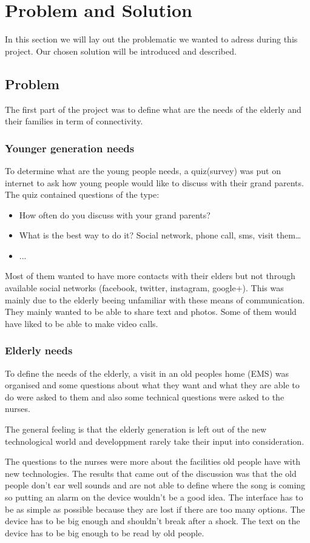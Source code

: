 \section{Problem and Solution}
In this section we will lay out the problematic we wanted to adress during this project. Our chosen solution will be introduced and described.
\subsection{Problem}
The first part of the project was to define what are the needs of the elderly and their families in term of connectivity.
\subsubsection{Younger generation needs}
To determine what are the young people needs, a quiz(survey) was put on internet to ask how young people would like to discuss with their grand parents.
The quiz contained questions of the type:
\begin{itemize}
\item{How often do you discuss with your grand parents?}
\item{What is the best way to do it? Social network, phone call, sms, visit them…}
\item{...}
\end{itemize}

Most of them wanted to have more contacts with their elders but not through available social networks (facebook, twitter, instagram, google+). This was mainly
due to the elderly beeing unfamiliar with these means of communication.
They mainly wanted to be able to share text and photos. Some of them would have liked to be able to make video calls.
\subsubsection{Elderly needs}
To define the needs of the elderly, a visit in an old peoples home (EMS) was organised and some questions about what they want and what they are able to do were asked to them and also some technical questions were asked to the nurses.

The general feeling is that the elderly generation is left out of the new technological world and developpment rarely take their input into consideration.

The questions to the nurses were more about the facilities old people have with new technologies. The results that came out of the discussion was that the old people don’t ear well sounds and are not able to define where the song is coming so putting an alarm on the device wouldn’t be a good idea. The interface has to be as simple as possible because they are lost if there are too many options. The device has to be big enough and shouldn’t break after a shock. The text on the device has to be big enough to be read by old people.

